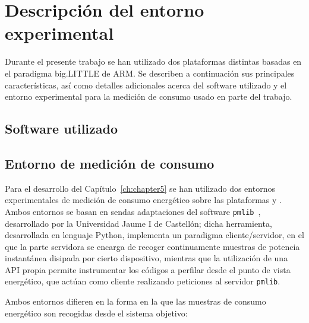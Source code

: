 \section{Descripción del entorno experimental}

Durante el presente trabajo se han utilizado dos plataformas distintas basadas en el paradigma big.LITTLE de ARM.
Se describen a continuación sus principales características, así como detalles adicionales acerca del software 
utilizado y el entorno experimental para la medición de consumo usado en parte del trabajo.

\subsection{\odroid}

\subsection{\juno}

\subsection{Software utilizado}

\subsection{Entorno de medición de consumo}

Para el desarrollo del Capítulo~\ref{ch:chapter5} se han utilizado dos entornos experimentales de medición de consumo
energético sobre las plataformas \odroid y \juno. Ambos entornos se basan en sendas adaptaciones del software {\tt pmlib}~\cite{pmlib},
desarrollado por la Universidad Jaume I de Castellón; dicha herramienta, desarrollada en lenguaje Python, implementa un paradigma
 cliente/servidor, en el que la parte servidora se encarga de recoger continuamente muestras de potencia instantánea disipada
por cierto dispositivo, mientras que la utilización de una API propia permite instrumentar los códigos a perfilar desde el
punto de vista energético, que actúan como cliente realizando peticiones al servidor {\tt pmlib}.

Ambos entornos difieren en la forma en la que las muestras de consumo energético son recogidas desde el sistema objetivo:

